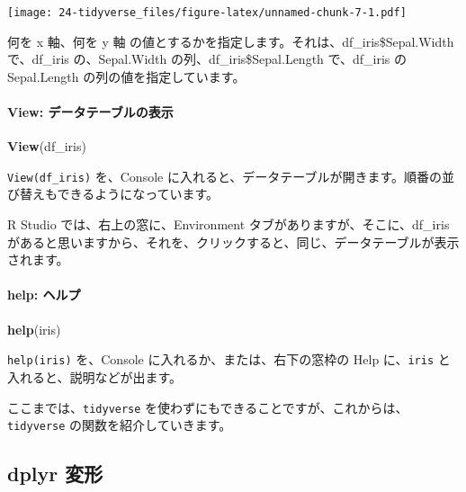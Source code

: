 \documentclass[
  xelatex, ja=standard]{bxjsbook}
\newenvironment{Shaded}{\begin{snugshade}}{\end{snugshade}}
\newcommand{\FunctionTok}[1]{\textcolor[rgb]{0.13,0.29,0.53}{\textbf{#1}}}
\newcommand{\NormalTok}[1]{#1}
\theoremstyle{definition}
\theoremstyle{definition}
\theoremstyle{definition}
\theoremstyle{definition}
\theoremstyle{remark}
\begin{document}
\texttt{[image: 24-tidyverse\_files/figure-latex/unnamed-chunk-7-1.pdf]}

何を x 軸、何を y 軸 の値とするかを指定します。それは、df\_iris\$Sepal.Width で、df\_iris の、Sepal.Width の列、df\_iris\$Sepal.Length で、df\_iris の Sepal.Length の列の値を指定しています。

\hypertarget{view-ux30c7ux30fcux30bfux30c6ux30fcux30d6ux30ebux306eux8868ux793a}{%
\paragraph{View: データテーブルの表示}\label{view-ux30c7ux30fcux30bfux30c6ux30fcux30d6ux30ebux306eux8868ux793a}}

\begin{Shaded}
\begin{Highlighting}[]
\FunctionTok{View}\NormalTok{(df\_iris)}
\end{Highlighting}
\end{Shaded}

\texttt{View(df\_iris)} を、Console に入れると、データテーブルが開きます。順番の並び替えもできるようになっています。

R Studio では、右上の窓に、Environment タブがありますが、そこに、df\_iris があると思いますから、それを、クリックすると、同じ、データテーブルが表示されます。

\hypertarget{help-ux30d8ux30ebux30d7}{%
\paragraph{help: ヘルプ}\label{help-ux30d8ux30ebux30d7}}

\begin{Shaded}
\begin{Highlighting}[]
\FunctionTok{help}\NormalTok{(iris)}
\end{Highlighting}
\end{Shaded}

\texttt{help(iris)} を、Console に入れるか、または、右下の窓枠の Help に、\texttt{iris} と入れると、説明などが出ます。

ここまでは、\texttt{tidyverse} を使わずにもできることですが、これからは、\texttt{tidyverse} の関数を紹介していきます。

\hypertarget{dplyr-ux5909ux5f62}{%
\subsection{dplyr 変形}\label{dplyr-ux5909ux5f62}}
\end{document}
